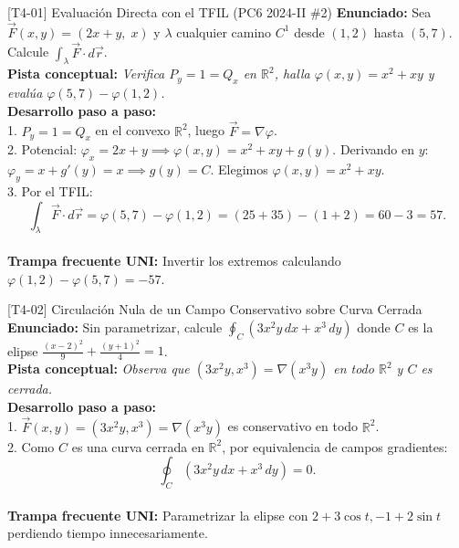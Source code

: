 \documentclass[11pt,a4paper]{article}
\begin{document}
\begin{ejerciciobox}{[T4-01] Evaluación Directa con el TFIL (PC6 2024-II \#2)}
\textbf{Enunciado:} Sea $\vec{F}(x,y) = (2x + y,\; x)$ y $\lambda$ cualquier camino $C^1$ desde $(1,2)$ hasta $(5,7)$. Calcule $\int_\lambda \vec{F}\cdot d\vec{r}$.\\[0.2cm]
\textbf{Pista conceptual:} \emph{Verifica $P_y = 1 = Q_x$ en $\mathbb{R}^2$, halla $\varphi(x,y) = x^2 + xy$ y evalúa $\varphi(5,7) - \varphi(1,2)$.}\\[0.2cm]
\textbf{Desarrollo paso a paso:}\\
1. $P_y = 1 = Q_x$ en el convexo $\mathbb{R}^2$, luego $\vec{F} = \nabla\varphi$.\\
2. Potencial: $\varphi_x = 2x + y \implies \varphi(x,y) = x^2 + xy + g(y)$. Derivando en $y$: $\varphi_y = x + g'(y) = x \implies g(y) = C$. Elegimos $\varphi(x,y) = x^2 + xy$.\\
3. Por el TFIL:\\
$$\int_\lambda \vec{F}\cdot d\vec{r} = \varphi(5,7) - \varphi(1,2) = (25 + 35) - (1 + 2) = 60 - 3 = 57.$$\\[0.2cm]
\textbf{Trampa frecuente UNI:} Invertir los extremos calculando $\varphi(1,2) - \varphi(5,7) = -57$.
\end{ejerciciobox}

\begin{ejerciciobox}{[T4-02] Circulación Nula de un Campo Conservativo sobre Curva Cerrada}
\textbf{Enunciado:} Sin parametrizar, calcule $\oint_C (3x^2 y\,dx + x^3\,dy)$ donde $C$ es la elipse $\frac{(x-2)^2}{9} + \frac{(y+1)^2}{4} = 1$.\\[0.2cm]
\textbf{Pista conceptual:} \emph{Observa que $(3x^2y, x^3) = \nabla(x^3 y)$ en todo $\mathbb{R}^2$ y $C$ es cerrada.}\\[0.2cm]
\textbf{Desarrollo paso a paso:}\\
1. $\vec{F}(x,y) = (3x^2y, x^3) = \nabla(x^3y)$ es conservativo en todo $\mathbb{R}^2$.\\
2. Como $C$ es una curva cerrada en $\mathbb{R}^2$, por equivalencia de campos gradientes:\\
$$\oint_C (3x^2y\,dx + x^3\,dy) = 0.$$\\[0.2cm]
\textbf{Trampa frecuente UNI:} Parametrizar la elipse con $2+3\cos t, -1+2\sin t$ perdiendo tiempo innecesariamente.
\end{ejerciciobox}
\end{document}
